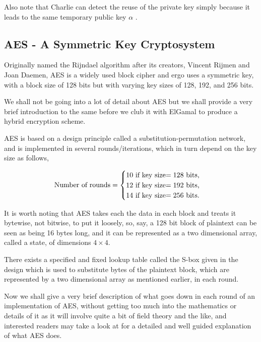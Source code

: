 Also note that Charlie can detect the reuse of the private key simply because it leads to the same temporary public key \( \alpha \) \cite{paar2009understanding}.

\subsection{AES - A Symmetric Key Cryptosystem}

Originally named the Rijndael algorithm after its creators, Vincent Rijmen and Joan Daemen, AES is a widely used block cipher and ergo uses a symmetric key, with a block size of 128 bits but with varying key sizes of 128, 192, and 256 bits.

We shall not be going into a lot of detail about AES but we shall provide a very brief introduction to the same before we club it with ElGamal to produce a hybrid encryption scheme.

AES is based on a design principle called a substitution-permutation network, and is implemented in several rounds/iterations, which in turn depend on the key size as follows,

\begin{align*}
    \text{Number of rounds}=\begin{cases}
    10 \text{ if key size$ = 128$ bits,}\\
    12 \text{ if key size$ = 192$ bits,}\\
    14 \text{ if key size$ = 256$ bits.}
    \end{cases}
\end{align*}

It is worth noting that AES takes each the data in each block and treats it bytewise, not bitwise, to put it loosely, so, say, a 128 bit block of plaintext can be seen as being 16 bytes long, and it can be represented as a two dimensional array, called a state, of dimensions $4\times4$.

There exists a specified and fixed lookup table called the S-box given in the design which is used to substitute bytes of the plaintext block, which are represented by a two dimensional array as mentioned earlier, in each round.

Now we shall give a very brief description of what goes down in each round of an implementation of AES, without getting too much into the mathematics or details of it as it will involve quite a bit of field theory and the like, and interested readers may take a look at \cite{daemen1999aes} for a detailed and well guided explanation of what AES does.


